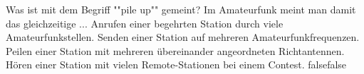     {Was ist mit dem Begriff ""pile up"" gemeint? Im Amateurfunk meint man damit das gleichzeitige ...}
    {Anrufen einer begehrten Station durch viele Amateurfunkstellen.}
    {Senden einer Station auf mehreren Amateurfunkfrequenzen.}
    {Peilen einer Station mit mehreren übereinander angeordneten Richtantennen.}
    {Hören einer Station mit vielen Remote-Stationen bei einem Contest.}
    {false}{false}
